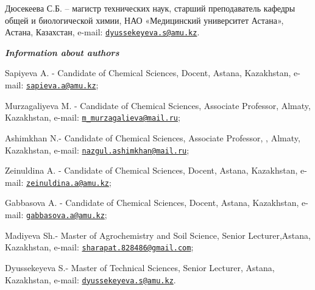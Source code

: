 Дюсекеева С.Б. -- магистр технических наук, старший преподаватель
кафедры общей и биологической химии, НАО «Медицинский университет
Астана», Астана, Казахстан, e-mail:
\href{mailto:dyussekeyeva.s@amu.kz}{\nolinkurl{dyussekeyeva.s@amu.kz}}.

\emph{{\bfseries Information about authors}}

Sapiyeva A. - Candidate of Chemical Sciences, Docent, Astana,
Kazakhstan, e-mail:
\href{mailto:sapieva.a@amu.kz}{\nolinkurl{sapieva.a@amu.kz}};

Murzagaliyeva M. - Candidate of Chemical Sciences, Associate Professor,
Almaty, Kazakhstan, e-mail:
\href{mailto:m_murzagalieva@mail.ru}{\nolinkurl{m\_murzagalieva@mail.ru}};

Ashimkhan N.- Candidate of Chemical Sciences, Associate Professor, ,
Almaty, Kazakhstan, e-mail:
\href{mailto:nazgul.ashimkhan@mail.ru}{\nolinkurl{nazgul.ashimkhan@mail.ru}};

Zeinuldina A. - Candidate of Chemical Sciences, Docent, Astana,
Kazakhstan, e-mail:
\href{mailto:zeinuldina.a@amu.kz}{\nolinkurl{zeinuldina.a@amu.kz}};

Gabbasova A. - Candidate of Chemical Sciences, Docent, Astana,
Kazakhstan, e-mail:
\href{mailto:gabbasova.a@amu.kz}{\nolinkurl{gabbasova.a@amu.kz}};

Madiyeva Sh.- Master of Agrochemistry and Soil Science, Senior
Lecturer,Astana, Kazakhstan, e-mail:
\href{mailto:sharapat.828486@gmail.com}{\nolinkurl{sharapat.828486@gmail.com}};

Dyussekeyeva S.- Master of Technical Sciences, Senior Lecturer, Astana,
Kazakhstan, e-mail:
\href{mailto:dyussekeyeva.s@amu.kz}{\nolinkurl{dyussekeyeva.s@amu.kz}}.